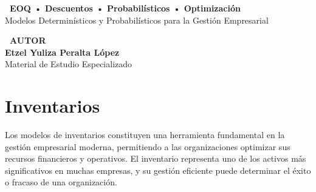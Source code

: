 \documentclass[12pt,a4paper]{book}
\begin{document}
\begin{titlepage}
		\vspace{1.5cm}
		
		\begin{tcolorbox}[colback=violetaclaro,colframe=moradoacento,boxrule=2pt,arc=10pt]
			\centering
			{\large\bfseries\color{moradoacento} \faLightbulb\ EOQ • Descuentos • Probabilísticos • Optimización}\\[0.3cm]
			{\normalsize\color{grisoScuro} Modelos Determinísticos y Probabilísticos para la Gestión Empresarial}
		\end{tcolorbox}
		
		\vfill
		
		\begin{tcolorbox}[colback=grisclaro,colframe=grisoScuro,boxrule=2pt,arc=8pt,drop shadow]
			\centering
			{\Large\bfseries\color{azulprincipal} \faUser\ AUTOR}\\[0.5cm]
			{\LARGE\bfseries\color{rojoacento} Etzel Yuliza Peralta López}\\[0.3cm]
			{\large\color{grisoScuro} Material de Estudio Especializado}
		\end{tcolorbox}
		
	\end{titlepage}
	
	\newpage
	
	\begin{tcolorbox}[colback=azulclaro,colframe=azulprincipal,boxrule=2pt,arc=10pt,title={\Large\bfseries\color{white} \faList\ CONTENIDO DEL CAPÍTULO}]
		\tableofcontents
	\end{tcolorbox}
	
	\newpage
	
	\chapter{Inventarios}
	
	\begin{tcolorbox}[colback=naranjaclaro,colframe=naranjaacento,boxrule=2pt,arc=10pt,title={\large\bfseries\color{white} \faInfoCircle\ INTRODUCCIÓN}]
		
		Los modelos de inventarios constituyen una herramienta fundamental en la gestión empresarial moderna, permitiendo a las organizaciones optimizar sus recursos financieros y operativos. El inventario representa uno de los activos más significativos en muchas empresas, y su gestión eficiente puede determinar el éxito o fracaso de una organización.
		
	\end{tcolorbox}
	
\end{document}
